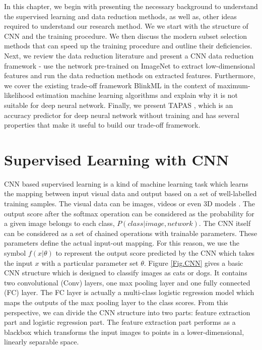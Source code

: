 In this chapter, we begin with presenting the necessary background to understand the supervised learning and data reduction methods, as well as, other ideas required to understand our research method.  We we start with the structure of CNN and the training procedure. We then discuss the modern subset selection methods that can speed up the training procedure and outline their deficiencies. Next, we review the data reduction literature and present a CNN data reduction framework - use the network pre-trained on ImageNet to extract low-dimensional features and run the data reduction methods on extracted features. Furthermore, we cover the existing trade-off framework BlinkML \cite{Park2019a} in the context of maximum-likelihood estimation machine learning algorithms and explain why it is not suitable for deep neural network. Finally, we present TAPAS \cite{Istrate2019}, which is an accuracy predictor for deep neural network without training and has several properties that make it useful to build our trade-off framework.

\section{Supervised Learning with CNN}
CNN based supervised learning is a kind of machine learning task which learns the mapping between input visual data and output based on a set of well-labelled training samples. The visual data can be images, videos or even 3D models \cite{Song2020}. The output score after the softmax operation can be considered as the probability for a given image belongs to each class, $P(class|image, network)$. The CNN itself can be considered as a set of chained operations with trainable parameters. These parameters define the actual input-out mapping. For this reason, we use the symbol $f(x|\theta)$ to represent the output score predicted by the CNN which takes the input $x$ with a particular parameter set $\theta$. Figure \ref{Fig.CNN} gives a basic CNN structure which is designed to classify images as cats or dogs. It contains two convolutional (Conv) layers, one max pooling layer and one fully connected (FC) layer. The FC layer is actually a multi-class logistic regression model which maps the outputs of the max pooling layer to the class scores. From this perspective, we can divide the CNN structure into two parts: feature extraction part and logistic regression part. The feature extraction part performs as a blackbox which transforms the input images to points in a lower-dimensional, linearly separable space.

